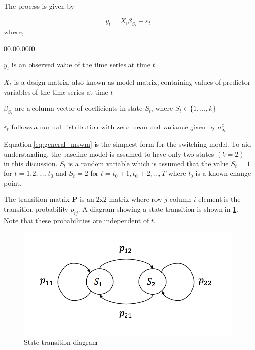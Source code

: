 The process is given by \citep{hamilton1989new}

\begin{equation}
y_{t}=X_{t}\beta_{S_{t}}+\varepsilon_{t}\label{eq:general_mswm}
\end{equation}
where, 
\begin{labeling}{00.00.0000}
\item [{$y_{t}$}] is an observed value of the time series at time $t$
\item [{$X_{t}$}] is a design matrix, also known as model matrix, containing
values of predictor variables of the time series at time $t$
\item [{$\beta_{S_{t}}$}] are a column vector of coefficients in state
$S_{t}$, where $S_{t}\in\{1,...,k\}$ 
\item [{$\varepsilon_{t}$}] follows a normal distribution with zero mean
and variance given by $\sigma_{S_{t}}^{2}$ 
\end{labeling}
Equation \ref{eq:general_mswm} is the simplest form for the switching
model. To aid understanding, the baseline model is assumed to have
only two states $(k=2)$ in this discussion. $S_{t}$ is a random
variable which is assumed that the value $S_{t}=1$ for $t=1,2,...,t_{0}$
and $S_{t}=2$ for $t=t_{0}+1,t_{0}+2,...,T$ where $t_{0}$ is a
known change point. 

The transition matrix $\mathbf{P}$ is an $2\mathrm{x}2$ matrix where
row $j$ column $i$ element is the transition probability $p_{ij}$.
A diagram showing a state-transition is shown in \ref{transition}.
Note that these probabilities are independent of $t$.

\begin{figure}[H]
\begin{centering}
\includegraphics[scale=0.6]{picture/transition}
\par\end{centering}
\caption{State-transition diagram}
\label{transition}
\end{figure}

